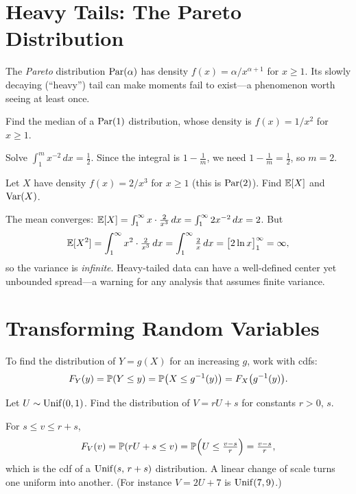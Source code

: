 \section{Heavy Tails: The Pareto Distribution}

The \emph{Pareto} distribution $\mathrm{Par}(\alpha)$ has density
$f(x)=\alpha/x^{\alpha+1}$ for $x\ge 1$. Its slowly decaying (``heavy'') tail can
make moments fail to exist—a phenomenon worth seeing at least once.

\begin{example}
Find the median of a $\mathrm{Par}(1)$ distribution, whose density is $f(x)=1/x^2$ for
$x\ge 1$.

\solution Solve $\int_1^m x^{-2}\,dx=\tfrac12$. Since the integral is
$1-\tfrac1m$, we need $1-\tfrac1m=\tfrac12$, so $m=2$.
\end{example}

\begin{example}
Let $X$ have density $f(x)=2/x^3$ for $x\ge 1$ (this is $\mathrm{Par}(2)$). Find $\mathbb{E}[X]$
and $\mathrm{Var}(X)$.

\solution The mean converges:
$\mathbb{E}[X]=\int_1^\infty x\cdot\tfrac{2}{x^3}\,dx=\int_1^\infty 2x^{-2}\,dx=2$. But
\[
  \mathbb{E}[X^2]=\int_1^\infty x^2\cdot\tfrac{2}{x^3}\,dx=\int_1^\infty \tfrac2x\,dx
   =\bigl[2\ln x\bigr]_1^\infty=\infty,
\]
so the variance is \emph{infinite}. Heavy-tailed data can have a well-defined
center yet unbounded spread—a warning for any analysis that assumes finite
variance.
\end{example}

\section{Transforming Random Variables}

To find the distribution of $Y=g(X)$ for an increasing $g$, work with cdfs:
\[
  F_Y(y)=\mathbb{P}(Y\le y)=\mathbb{P}\bigl(X\le g^{-1}(y)\bigr)=F_X\bigl(g^{-1}(y)\bigr).
\]

\begin{example}
Let $U\sim\mathrm{Unif}(0,1)$. Find the distribution of $V=rU+s$ for constants $r>0$,
$s$.

\solution For $s\le v\le r+s$,
\[
  F_V(v)=\mathbb{P}(rU+s\le v)=\mathbb{P}\Bigl(U\le\tfrac{v-s}{r}\Bigr)=\tfrac{v-s}{r},
\]
which is the cdf of a $\mathrm{Unif}(s,\,r+s)$ distribution. A linear change of scale
turns one uniform into another. (For instance $V=2U+7$ is $\mathrm{Unif}(7,9)$.)
\end{example}

